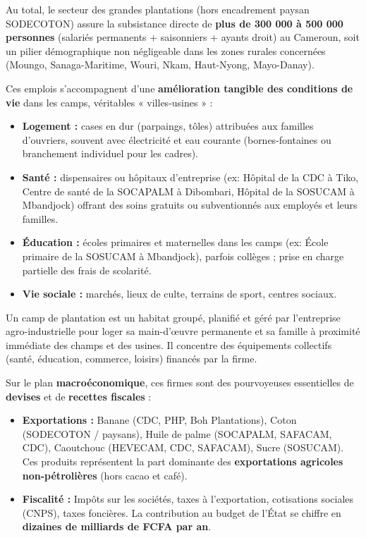 \documentclass[11pt]{article}
\newcommand{\cle}[1]{{\popxbold\color{popdark}#1}}
\begin{document}
\begin{aretenir}
Au total, le secteur des grandes plantations (hors encadrement paysan SODECOTON) assure la subsistance directe de \textbf{plus de 300 000 à 500 000 personnes} (salariés permanents + saisonniers + ayants droit) au Cameroun, soit un pilier démographique non négligeable dans les zones rurales concernées (Moungo, Sanaga-Maritime, Wouri, Nkam, Haut-Nyong, Mayo-Danay).
\end{aretenir}

\noindent
Ces emplois s'accompagnent d'une \textbf{amélioration tangible des conditions de vie} dans les camps, véritables « villes-usines » :
\begin{itemize}
    \item \textbf{Logement :} cases en dur (parpaings, tôles) attribuées aux familles d'ouvriers, souvent avec électricité et eau courante (bornes-fontaines ou branchement individuel pour les cadres).
    \item \textbf{Santé :} dispensaires ou hôpitaux d'entreprise (ex: Hôpital de la CDC à Tiko, Centre de santé de la SOCAPALM à Dibombari, Hôpital de la SOSUCAM à Mbandjock) offrant des soins gratuits ou subventionnés aux employés et leurs familles.
    \item \textbf{Éducation :} écoles primaires et maternelles dans les camps (ex: École primaire de la SOSUCAM à Mbandjock), parfois collèges ; prise en charge partielle des frais de scolarité.
    \item \textbf{Vie sociale :} marchés, lieux de culte, terrains de sport, centres sociaux.
\end{itemize}

\begin{definition}
Un \cle{camp de plantation} est un habitat groupé, planifié et géré par l'entreprise agro-industrielle pour loger sa main-d'œuvre permanente et sa famille à proximité immédiate des champs et des usines. Il concentre des équipements collectifs (santé, éducation, commerce, loisirs) financés par la firme.
\end{definition}

\noindent
Sur le plan \textbf{macroéconomique}, ces firmes sont des pourvoyeuses essentielles de \textbf{devises} et de \textbf{recettes fiscales} :
\begin{itemize}
    \item \textbf{Exportations :} Banane (CDC, PHP, Boh Plantations), Coton (SODECOTON / paysans), Huile de palme (SOCAPALM, SAFACAM, CDC), Caoutchouc (HEVECAM, CDC, SAFACAM), Sucre (SOSUCAM). Ces produits représentent la part dominante des \textbf{exportations agricoles non-pétrolières} (hors cacao et café).
    \item \textbf{Fiscalité :} Impôts sur les sociétés, taxes à l'exportation, cotisations sociales (CNPS), taxes foncières. La contribution au budget de l'État se chiffre en \textbf{dizaines de milliards de FCFA par an}.
\end{itemize}
\end{document}
